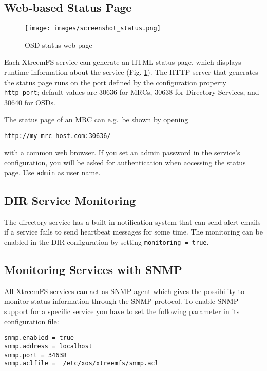 \documentclass[a4paper,10pt]{book}
\begin{document}
\subsection{Web-based Status Page}

\begin{figure}[h]
 \centering
 \texttt{[image: images/screenshot\_status.png]}
 \caption{OSD status web page}
 \label{fig:screenshot_status}
\end{figure}

Each XtreemFS service can generate an HTML status page, which displays runtime information about the service (Fig. \ref{fig:screenshot_status}). The HTTP server that generates the status page runs on the port defined by the configuration property \texttt{http\_port}; default values are 30636 for MRCs, 30638 for Directory Services, and 30640 for OSDs.

The status page of an MRC can e.g.\ be shown by opening

\texttt{http://my-mrc-host.com:30636/}

with a common web browser. If you set an admin password in the service's configuration, you will be asked for authentication when accessing the status page. Use \texttt{admin} as user name.

\subsection{DIR Service Monitoring}

The directory service has a built-in notification system that can send alert emails if a service fails to send heartbeat messages for some time. The monitoring can be enabled in the DIR configuration by setting \texttt{monitoring = true}.

\subsection{Monitoring Services with SNMP}
\label{sec:snmpmonitoring}
All XtreemFS services can act as SNMP agent which gives the possibility to monitor status information through the SNMP protocol. To enable SNMP support for a specific service you have to set the following parameter in its configuration file:

\begin{verbatim}
snmp.enabled = true
snmp.address = localhost
snmp.port = 34638
snmp.aclfile =  /etc/xos/xtreemfs/snmp.acl
\end{verbatim}
\end{document}
